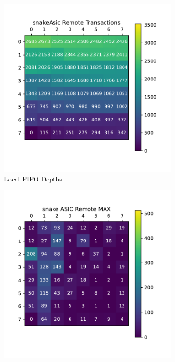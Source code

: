 \begin{figure}
\centering
\begin{subfigure}{.5\textwidth}
  \centering
  \includegraphics[width=\textwidth]{images/snake_asic_trans.pdf}
  \caption{Local FIFO Depths}
\end{subfigure}%
\begin{subfigure}{.5\textwidth}
  \centering
  \includegraphics[width=\textwidth]{images/snake_asic_remote.pdf}

\end{subfigure}
\end{figure}
